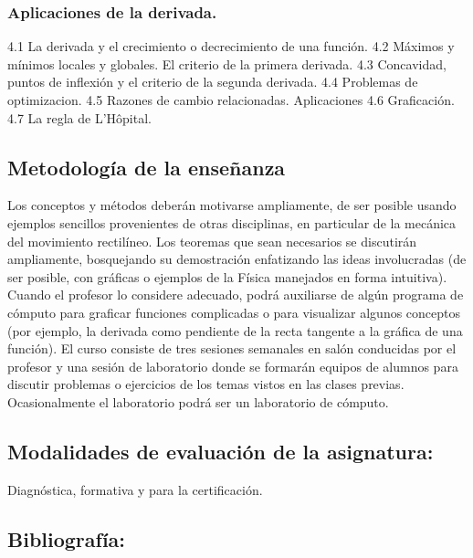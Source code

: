 \documentclass[12pt]{article}
\begin{document}
\subsubsection{Aplicaciones de la
derivada.}\label{aplicaciones-de-la-derivada.}

4.1 La derivada y el crecimiento o decrecimiento de una función. 4.2
Máximos y mínimos locales y globales. El criterio de la primera
derivada. 4.3 Concavidad, puntos de inflexión y el criterio de la
segunda derivada. 4.4 Problemas de optimizacion. 4.5 Razones de cambio
relacionadas. Aplicaciones 4.6 Graficación. 4.7 La regla de L'Hôpital.

\subsection{Metodología de la
enseñanza}\label{metodologuxeda-de-la-enseuxf1anza}

Los conceptos y métodos deberán motivarse ampliamente, de ser posible
usando ejemplos sencillos provenientes de otras disciplinas, en
particular de la mecánica del movimiento rectilíneo. Los teoremas que
sean necesarios se discutirán ampliamente, bosquejando su demostración
enfatizando las ideas involucradas (de ser posible, con gráficas o
ejemplos de la Física manejados en forma intuitiva). Cuando el profesor
lo considere adecuado, podrá auxiliarse de algún programa de cómputo
para graficar funciones complicadas o para visualizar algunos conceptos
(por ejemplo, la derivada como pendiente de la recta tangente a la
gráfica de una función). El curso consiste de tres sesiones semanales en
salón conducidas por el profesor y una sesión de laboratorio donde se
formarán equipos de alumnos para discutir problemas o ejercicios de los
temas vistos en las clases previas. Ocasionalmente el laboratorio podrá
ser un laboratorio de cómputo.

\subsection{Modalidades de evaluación de la
asignatura:}\label{modalidades-de-evaluaciuxf3n-de-la-asignatura}

Diagnóstica, formativa y para la certificación.

\subsection{Bibliografía:}\label{bibliografuxeda}
\end{document}
